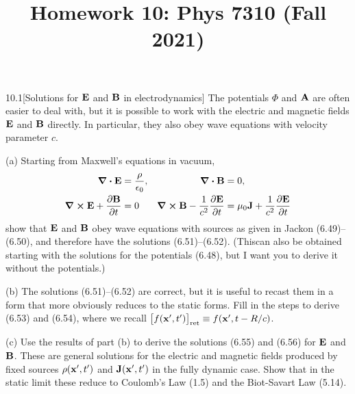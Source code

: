 \documentclass[12pt]{article}
\title{Homework 10: Phys 7310 (Fall 2021)}
\begin{document}
\maketitle
\begin{problem}{10.1}[Solutions for $\vb{E}$ and $\vb{B}$ in electrodynamics]
The potentials $\Phi$ and $\vb{A}$ are often easier to deal with, but it is
possible to work with the electric and magnetic fields $\vb{E}$ and $\vb{B}$
directly. In particular, they also obey wave equations with velocity parameter
$c$.

(a) Starting from Maxwell's equations in vacuum,
\begin{align}
    \div{\vb{E}}&=\frac{\rho}{\epsilon_0}, &
    \div{\vb{B}}&=0,\notag\\
    \curl{\vb{E}}+\frac{\partial\vb{B}}{\partial t}&=0 &
    \curl{\vb{B}}-\frac1{c^2}\frac{\partial\vb{E}}{\partial t}&=\mu_0\vb{J}
    +\frac1{c^2}\frac{\partial\vb{E}}{\partial t}
\end{align}
show that $\vb{E}$ and $\vb{B}$ obey wave equations with sources as given in
Jackon (6.49)--(6.50), and therefore have the solutions (6.51)--(6.52). (Thiscan
also be obtained starting with the solutions for the potentials (6.48), but I
want you to derive it without the potentials.)

(b) The solutions (6.51)--(6.52) are correct, but it is useful to recast them in
a form that more obviously reduces to the static forms. Fill in the steps to
derive (6.53) and (6.54), where we recall $\qty[f(\vb{x}',t')]_\text{ret}\equiv
f(\vb{x}',t-R /c)$.

(c) Use the results of part (b) to derive the solutions (6.55) and (6.56) for
$\vb{E}$ and $\vb{B}$. These are general solutions for the electric and magnetic
fields produced by fixed sources $\rho(\vb{x}',t')$ and $\vb{J}(\vb{x}',t')$ in
the fully dynamic case. Show that in the static limit these reduce to Coulomb's
Law (1.5) and the Biot-Savart Law (5.14).


\end{problem}
\end{document}
